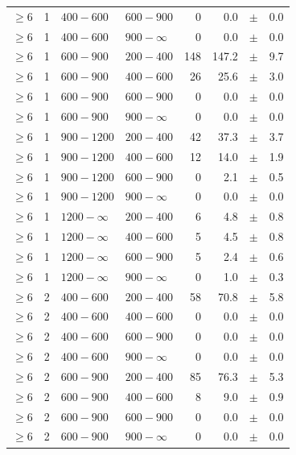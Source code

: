 \begin{table}[!t]
\begin{tabular}{rrllrrcl}
$\geq 6$ & 1 & $ 400- 600$ & $600-900$ &      0 &      0.0 &$\pm$&    0.0 \\
$\geq 6$ & 1 & $ 400- 600$ & $900-\infty$ &      0 &      0.0 &$\pm$&    0.0 \\
$\geq 6$ & 1 & $ 600- 900$ & $200-400$ &    148 &    147.2 &$\pm$&    9.7 \\
$\geq 6$ & 1 & $ 600- 900$ & $400-600$ &     26 &     25.6 &$\pm$&    3.0 \\
$\geq 6$ & 1 & $ 600- 900$ & $600-900$ &      0 &      0.0 &$\pm$&    0.0 \\
$\geq 6$ & 1 & $ 600- 900$ & $900-\infty$ &      0 &      0.0 &$\pm$&    0.0 \\
$\geq 6$ & 1 & $ 900-1200$ & $200-400$ &     42 &     37.3 &$\pm$&    3.7 \\
$\geq 6$ & 1 & $ 900-1200$ & $400-600$ &     12 &     14.0 &$\pm$&    1.9 \\
$\geq 6$ & 1 & $ 900-1200$ & $600-900$ &      0 &      2.1 &$\pm$&    0.5 \\
$\geq 6$ & 1 & $ 900-1200$ & $900-\infty$ &      0 &      0.0 &$\pm$&    0.0 \\
$\geq 6$ & 1 & $1200- \infty$ & $200-400$ &      6 &      4.8 &$\pm$&    0.8 \\
$\geq 6$ & 1 & $1200- \infty$ & $400-600$ &      5 &      4.5 &$\pm$&    0.8 \\
$\geq 6$ & 1 & $1200- \infty$ & $600-900$ &      5 &      2.4 &$\pm$&    0.6 \\
$\geq 6$ & 1 & $1200- \infty$ & $900-\infty$ &      0 &      1.0 &$\pm$&    0.3 \\
$\geq 6$ & 2 & $ 400- 600$ & $200-400$ &     58 &     70.8 &$\pm$&    5.8 \\
$\geq 6$ & 2 & $ 400- 600$ & $400-600$ &      0 &      0.0 &$\pm$&    0.0 \\
$\geq 6$ & 2 & $ 400- 600$ & $600-900$ &      0 &      0.0 &$\pm$&    0.0 \\
$\geq 6$ & 2 & $ 400- 600$ & $900-\infty$ &      0 &      0.0 &$\pm$&    0.0 \\
$\geq 6$ & 2 & $ 600- 900$ & $200-400$ &     85 &     76.3 &$\pm$&    5.3 \\
$\geq 6$ & 2 & $ 600- 900$ & $400-600$ &      8 &      9.0 &$\pm$&    0.9 \\
$\geq 6$ & 2 & $ 600- 900$ & $600-900$ &      0 &      0.0 &$\pm$&    0.0 \\
$\geq 6$ & 2 & $ 600- 900$ & $900-\infty$ &      0 &      0.0 &$\pm$&    0.0 \\

\end{tabular}
\end{table}
